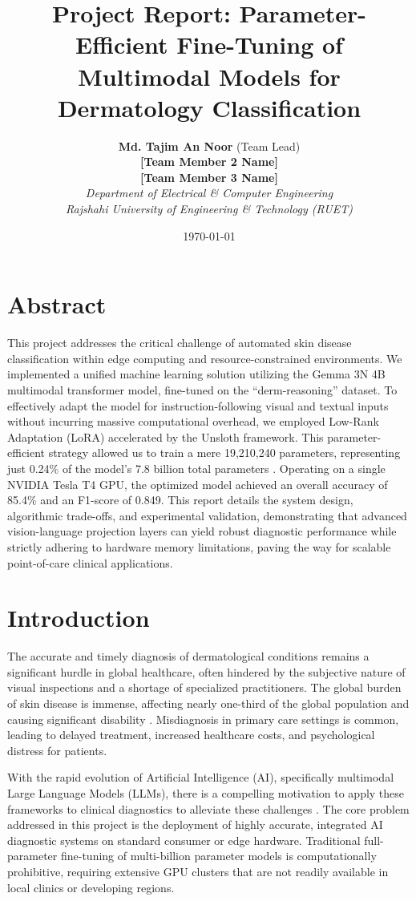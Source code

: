 \documentclass[12pt, a4paper]{article}
\title{\textbf{Project Report: Parameter-Efficient Fine-Tuning of Multimodal Models for Dermatology Classification}}
\author{
    \textbf{Md. Tajim An Noor} (Team Lead) \\
    \textbf{[Team Member 2 Name]} \\
    \textbf{[Team Member 3 Name]} \\
    \textit{Department of Electrical \& Computer Engineering} \\
    \textit{Rajshahi University of Engineering \& Technology (RUET)}
}
\date{\today}
\begin{document}
\maketitle
\newpage

\tableofcontents
\newpage

\section{Abstract}
This project addresses the critical challenge of automated skin disease classification within edge computing and resource-constrained environments. We implemented a unified machine learning solution utilizing the Gemma 3N 4B multimodal transformer model, fine-tuned on the ``derm-reasoning'' dataset. To effectively adapt the model for instruction-following visual and textual inputs without incurring massive computational overhead, we employed Low-Rank Adaptation (LoRA) accelerated by the Unsloth framework. This parameter-efficient strategy allowed us to train a mere 19,210,240 parameters, representing just 0.24\% of the model's 7.8 billion total parameters \cite{gemma_3n_2025}. Operating on a single NVIDIA Tesla T4 GPU, the optimized model achieved an overall accuracy of 85.4\% and an F1-score of 0.849. This report details the system design, algorithmic trade-offs, and experimental validation, demonstrating that advanced vision-language projection layers can yield robust diagnostic performance while strictly adhering to hardware memory limitations, paving the way for scalable point-of-care clinical applications.

\section{Introduction}
The accurate and timely diagnosis of dermatological conditions remains a significant hurdle in global healthcare, often hindered by the subjective nature of visual inspections and a shortage of specialized practitioners. The global burden of skin disease is immense, affecting nearly one-third of the global population and causing significant disability \cite{hay2014global}. Misdiagnosis in primary care settings is common, leading to delayed treatment, increased healthcare costs, and psychological distress for patients.

With the rapid evolution of Artificial Intelligence (AI), specifically multimodal Large Language Models (LLMs), there is a compelling motivation to apply these frameworks to clinical diagnostics to alleviate these challenges \cite{moor2023foundation}. The core problem addressed in this project is the deployment of highly accurate, integrated AI diagnostic systems on standard consumer or edge hardware. Traditional full-parameter fine-tuning of multi-billion parameter models is computationally prohibitive, requiring extensive GPU clusters that are not readily available in local clinics or developing regions.
\end{document}
